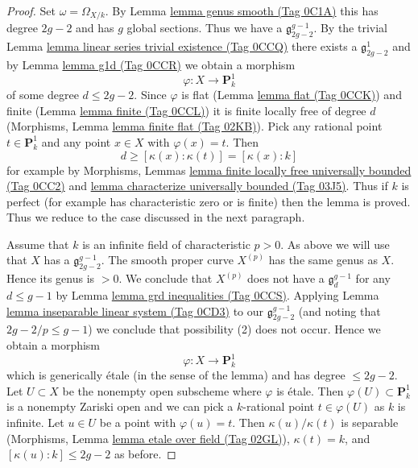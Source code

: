 \documentclass{amsart}
\theoremstyle{plain}
\theoremstyle{definition}
\theoremstyle{remark}
\numberwithin{equation}{subsection}
\begin{document}
\begin{proof}
Set $\omega = \Omega_{X/k}$. By
Lemma \href{https://stacks.math.columbia.edu/tag/0C1A}{lemma genus smooth (Tag 0C1A)} this has degree $2g - 2$
and has $g$ global sections. Thus we have a $\mathfrak g^{g - 1}_{2g - 2}$.
By the trivial Lemma \href{https://stacks.math.columbia.edu/tag/0CCQ}{lemma linear series trivial existence (Tag 0CCQ)}
there exists a $\mathfrak g^1_{2g - 2}$
and by Lemma \href{https://stacks.math.columbia.edu/tag/0CCR}{lemma g1d (Tag 0CCR)} we obtain a morphism
$$
\varphi : X \longrightarrow \mathbf{P}^1_k
$$
of some degree $d \leq 2g - 2$. Since $\varphi$ is flat
(Lemma \href{https://stacks.math.columbia.edu/tag/0CCK}{lemma flat (Tag 0CCK)}) and finite
(Lemma \href{https://stacks.math.columbia.edu/tag/0CCL}{lemma finite (Tag 0CCL)})
it is finite locally free of degree $d$
(Morphisms, Lemma \href{https://stacks.math.columbia.edu/tag/02KB}{lemma finite flat (Tag 02KB)}).
Pick any rational point $t \in \mathbf{P}^1_k$
and any point $x \in X$ with $\varphi(x) = t$.
Then
$$
d \geq [\kappa(x) : \kappa(t)] = [\kappa(x) : k]
$$
for example by
Morphisms, Lemmas \href{https://stacks.math.columbia.edu/tag/0CC2}{lemma finite locally free universally bounded (Tag 0CC2)}
and \href{https://stacks.math.columbia.edu/tag/03J5}{lemma characterize universally bounded (Tag 03J5)}.
Thus if $k$ is perfect (for example has characteristic zero
or is finite) then the lemma is proved. Thus we reduce to the
case discussed in the next paragraph.

\medskip\noindent
Assume that $k$ is an infinite field of characteristic $p > 0$.
As above we will use that $X$ has a $\mathfrak g^{g - 1}_{2g - 2}$.
The smooth proper curve $X^{(p)}$ has the same genus as $X$.
Hence its genus is $> 0$. We conclude that $X^{(p)}$ does not have a
$\mathfrak g^{g - 1}_d$ for any $d \leq g - 1$ by
Lemma \href{https://stacks.math.columbia.edu/tag/0CCS}{lemma grd inequalities (Tag 0CCS)}.
Applying Lemma \href{https://stacks.math.columbia.edu/tag/0CD3}{lemma inseparable linear system (Tag 0CD3)}
to our $\mathfrak g^{g - 1}_{2g - 2}$ (and noting that $2g - 2/p \leq g - 1$)
we conclude that possibility (2) does not occur. Hence we obtain a morphism
$$
\varphi : X \longrightarrow \mathbf{P}^1_k
$$
which is generically \'etale (in the sense of the lemma)
and has degree $\leq 2g - 2$. Let $U \subset X$ be the nonempty
open subscheme where $\varphi$ is \'etale. Then
$\varphi(U) \subset \mathbf{P}^1_k$ is a nonempty Zariski open
and we can pick a $k$-rational point $t \in \varphi(U)$ as $k$ is infinite.
Let $u \in U$ be a point with $\varphi(u) = t$.
Then $\kappa(u)/\kappa(t)$ is separable
(Morphisms, Lemma \href{https://stacks.math.columbia.edu/tag/02GL}{lemma etale over field (Tag 02GL)}),
$\kappa(t) = k$, and $[\kappa(u) : k] \leq 2g - 2$ as before.
\end{proof}
\end{document}
